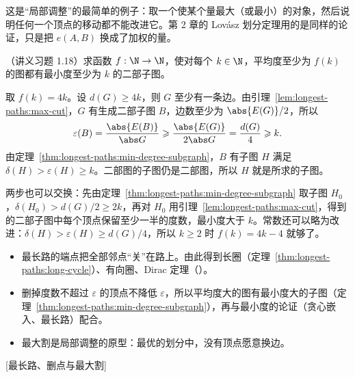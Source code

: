 这是“局部调整”的最简单的例子：取一个使某个量最大（或最小）的对象，然后说明任何一个顶点的移动都不能改进它。第 2 章的 Lovász 划分定理用的是同样的论证，只是把 $e(A,B)$ 换成了加权的量。

\begin{workedexample}\label{we:longest-paths:bipartite-subgraph}
（讲义习题 1.18）求函数 $f:\N\to\N$，使对每个 $k\in\N$，平均度至少为 $f(k)$ 的图都有最小度至少为 $k$ 的二部子图。
\end{workedexample}
\begin{solution}
取 $f(k)=4k$。设 $d(G)\geqslant4k$，则 $G$ 至少有一条边。由引理~\ref{lem:longest-paths:max-cut}，$G$ 有生成二部子图 $B$，边数至少为 $\abs{E(G)}/2$，所以
\[
\varepsilon(B)=\frac{\abs{E(B)}}{\abs G}\geqslant\frac{\abs{E(G)}}{2\abs G}=\frac{d(G)}4\geqslant k .
\]
由定理~\ref{thm:longest-paths:min-degree-subgraph}，$B$ 有子图 $H$ 满足 $\delta(H)>\varepsilon(H)\geqslant k$。二部图的子图仍是二部图，所以 $H$ 就是所求的子图。

两步也可以交换：先由定理~\ref{thm:longest-paths:min-degree-subgraph} 取子图 $H_0$，$\delta(H_0)>d(G)/2\geqslant2k$，再对 $H_0$ 用引理~\ref{lem:longest-paths:max-cut}，得到的二部子图中每个顶点保留至少一半的度数，最小度大于 $k$。常数还可以略为改进：$\delta(H)>\varepsilon(H)\geqslant d(G)/4$，所以 $k\geqslant2$ 时 $f(k)=4k-4$ 就够了。
\end{solution}


\begin{itemize}
\item 最长路的端点把全部邻点“关”在路上。由此得到长圈（定理~\ref{thm:longest-paths:long-cycle}）、有向圈、Dirac 定理（）。
\item 删掉度数不超过 $\varepsilon$ 的顶点不降低 $\varepsilon$，所以平均度大的图有最小度大的子图（定理~\ref{thm:longest-paths:min-degree-subgraph}），再与最小度的论证（贪心嵌入、最长路）配合。
\item 最大割是局部调整的原型：最优的划分中，没有顶点愿意换边。
\end{itemize}

[最长路、删点与最大割]


